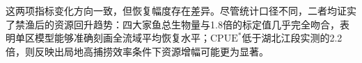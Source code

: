 这两项指标变化方向一致，但恢复幅度存在差异。尽管统计口径不同，二者均证实了禁渔后的资源回升趋势：四大家鱼总生物量与1.8倍的标定值几乎完全吻合，表明单区模型能够准确刻画全流域平均恢复水平；$\mathrm{CPUE}^*$低于湖北江段实测的2.2倍，则反映出局地高捕捞效率条件下资源增幅可能更为显著。
